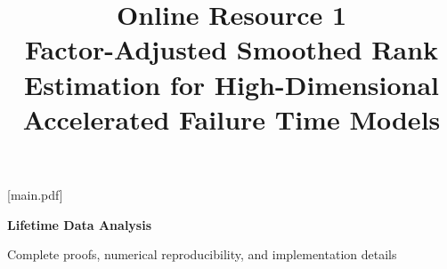 
[main.pdf]
\renewcommand{\thepage}{S\arabic{page}}

\renewcommand{\thefigure}{S\arabic{figure}}
\title{Online Resource 1\\Factor-Adjusted Smoothed Rank Estimation for High-Dimensional Accelerated Failure Time Models}
\date{}\maketitle
\noindent\textbf{Lifetime Data Analysis}\par
\noindent Complete proofs, numerical reproducibility, and implementation details\par
\medskip

\clearpage

